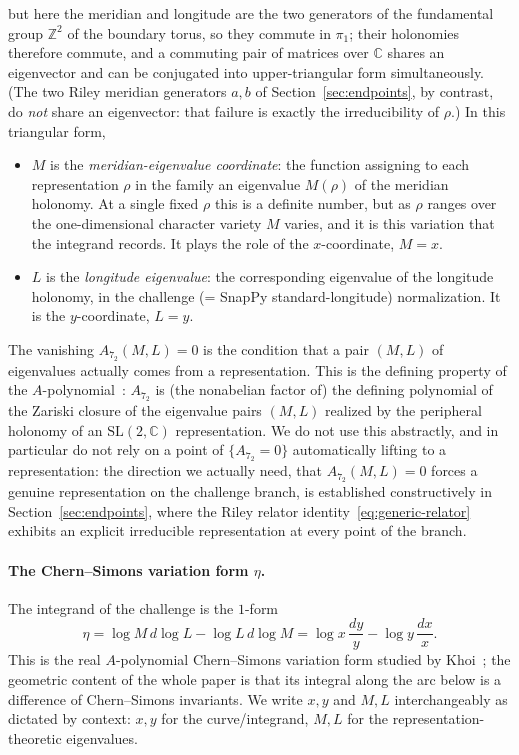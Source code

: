\documentclass[11pt]{article}
\theoremstyle{definition}
\newcommand{\C}{\mathbb{C}}
\newcommand{\Z}{\mathbb{Z}}
\newcommand{\SL}{\mathrm{SL}}
\begin{document}
but here the meridian and longitude are the two generators of the fundamental
group $\Z^2$ of the boundary torus, so they commute in $\pi_1$; their holonomies
therefore commute, and a commuting pair of matrices over $\C$ shares an
eigenvector and can be conjugated into upper-triangular form simultaneously.
(The two Riley meridian generators $a,b$ of Section~\ref{sec:endpoints}, by
contrast, do \emph{not} share an eigenvector: that failure is exactly the
irreducibility of $\rho$.)  In this triangular form,
\begin{itemize}[nosep]
 \item $M$ is the \emph{meridian-eigenvalue coordinate}: the function assigning
 to each representation $\rho$ in the family an eigenvalue $M(\rho)$ of the
 meridian holonomy.  At a single fixed $\rho$ this is a definite number, but as
 $\rho$ ranges over the one-dimensional character variety $M$ varies, and it is
 this variation that the integrand records.  It plays the role of the
 $x$-coordinate, $M=x$.
 \item $L$ is the \emph{longitude eigenvalue}: the corresponding eigenvalue of
 the longitude holonomy, in the challenge (= SnapPy standard-longitude)
 normalization.  It is the $y$-coordinate, $L=y$.
\end{itemize}
The vanishing $A_{7_2}(M,L)=0$ is the condition that a pair $(M,L)$ of
eigenvalues actually comes from a representation.  This is the defining property
of the $A$-polynomial~\cite{CCGLS}: $A_{7_2}$ is (the nonabelian factor of) the
defining polynomial of the Zariski closure of the eigenvalue pairs $(M,L)$
realized by the peripheral holonomy of an $\SL(2,\C)$ representation.  We do not
use this abstractly, and in particular do not rely on a point of
$\{A_{7_2}=0\}$ automatically lifting to a representation: the direction we
actually need, that $A_{7_2}(M,L)=0$ forces a genuine representation on the
challenge branch, is established constructively in
Section~\ref{sec:endpoints}, where the Riley relator
identity~\eqref{eq:generic-relator} exhibits an explicit irreducible
representation at every point of the branch.

\paragraph{The Chern--Simons variation form $\eta$.}
The integrand of the challenge is the $1$-form
\begin{equation}\label{eq:eta}
 \eta=\log M\,d\log L-\log L\,d\log M
 =\log x\,\frac{dy}{y}-\log y\,\frac{dx}{x}.
\end{equation}
This is the real $A$-polynomial Chern--Simons variation form studied by
Khoi~\cite{Khoi}; the geometric content of the whole paper is that its integral
along the arc below is a difference of Chern--Simons invariants.  We write $x,y$
and $M,L$ interchangeably as dictated by context: $x,y$ for the curve/integrand,
$M,L$ for the representation-theoretic eigenvalues.
\end{document}
